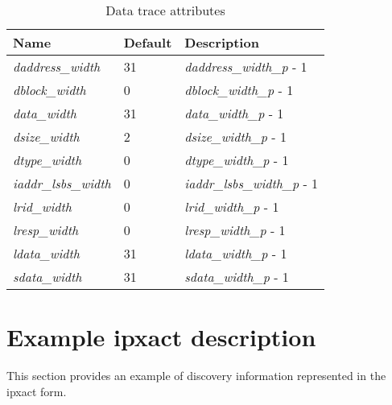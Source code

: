 \begin{table}[!h]
    \centering
    \caption{Data trace attributes}
    \label{tab:dataAttributes}
    \begin{tabulary}{\textwidth}{|l|l|p{80mm}|}
        \hline
        \textbf{Name} & \textbf{Default} & \textbf{Description} \\
        \hline
        \textit{daddress\_width} & 31 & \textit{daddress\_width\_p} - 1\\
        \hline
        \textit{dblock\_width} & 0 & \textit{dblock\_width\_p} - 1\\
        \hline
        \textit{data\_width} & 31 & \textit{data\_width\_p} - 1\\
        \hline
        \textit{dsize\_width} & 2 & \textit{dsize\_width\_p} - 1\\
        \hline
        \textit{dtype\_width} & 0 & \textit{dtype\_width\_p} - 1\\
        \hline
        \textit{iaddr\_lsbs\_width} & 0 & \textit{iaddr\_lsbs\_width\_p} - 1\\
        \hline
        \textit{lrid\_width}  & 0  & \textit{lrid\_width\_p} - 1\\
        \hline
        \textit{lresp\_width} & 0  & \textit{lresp\_width\_p} - 1\\
        \hline
        \textit{ldata\_width} & 31 & \textit{ldata\_width\_p} - 1\\
        \hline
        \textit{sdata\_width} & 31 & \textit{sdata\_width\_p} - 1\\
        \hline
    \end{tabulary}
\end{table}

\FloatBarrier
\section{Example ipxact description} \label{sec:ipxact}

This section provides an example of discovery information represented in
the ipxact form.


